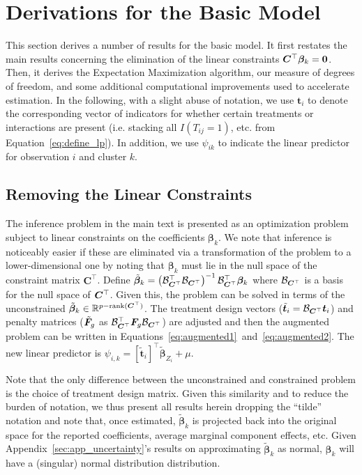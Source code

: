 \section{Derivations for the Basic Model}
\label{sec:app_derivations}

This section derives a number of results for the basic model. It first
restates the main results concerning the elimination of the linear
constraints $\bm{C}^\top \bm{\beta}_k = \bm{0}$. Then, it derives the
Expectation Maximization algorithm, our measure of degrees of freedom,
and some additional computational improvements used to accelerate
estimation.  In the following, with a slight abuse of notation, we use
$\bm{t}_i$ to denote the corresponding vector of indicators for
whether certain treatments or interactions are present (i.e. stacking
all $I(T_{ij} = 1)$, etc. from Equation~\ref{eq:define_lp}).  In
addition, we use $\psi_{ik}$ to indicate the linear predictor for
observation $i$ and cluster $k$.

\subsection{Removing the Linear Constraints}
\label{sec:app_derivation_LC}

The inference problem in the main text is presented as an optimization
problem subject to linear constraints on the coefficients
$\bm{\beta}_k$. We note that inference is noticeably easier if these
are eliminated via a transformation of the problem to a
lower-dimensional one by noting that $\bm{\beta}_k$ must lie in the
null space of the constraint matrix $\bm{C}^\top$. Define
$\tilde{\bm{\beta}}_k = \left(\mathcal{B}_{\bm{C}^\top}^\top
  \mathcal{B}_{\bm{C}^\top}\right)^{-1}
\mathcal{B}_{\bm{C}^\top}^\top\bm{\beta}_k$ where $\mathcal{B}_{\bm{C}^\top}$ is
a basis for the null space of $\bm{C}^\top$. Given this, the problem can
be solved in terms of the unconstrained
$\tilde{\bm{\beta}}_k \in \mathbb{R}^{p-\mathrm{rank}(\bm{C}^\top)}$. The
treatment design vectors
($\tilde{\bm{t}}_i = \mathcal{B}_{\bm{C}^\top} \bm{t}_i$) and penalty
matrices ($\tilde{\bm{F}}_g$ as
$\mathcal{B}_{\bm{C}^\top}^\top \bm{F}_g \mathcal{B}_{\bm{C}^\top}$) are
adjusted and then the augmented problem can be written in
Equations~\eqref{eq:augmented1}~and~\eqref{eq:augmented2}. The new
linear predictor is
$\psi_{i,k} = \left[\tilde{\bm{t}}_i\right]^\top
\tilde{\bm{\beta}}_{Z_i} + \mu$.

Note that the only difference between the unconstrained and
constrained problem is the choice of treatment design matrix. Given
this similarity and to reduce the burden of notation, we thus present
all results herein dropping the ``tilde'' notation and note that, once
estimated, $\tilde{\bm{\beta}}_k$ is projected back into the original
space for the reported coefficients, average marginal component effects,
etc. Given Appendix~\ref{sec:app_uncertainty}'s results on
approximating $\tilde{\bm{\beta}}_k$ as normal, $\bm{\beta}_k$ will
have a (singular) normal distribution distribution.

